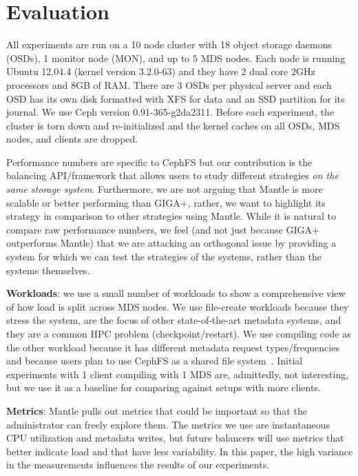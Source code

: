\section{Evaluation}									%
\label{evaluation}										%
All experiments are run on a 10 node cluster with 18 object storage daemons (OSDs), 1 monitor node (MON), and up to 5 MDS nodes. Each node is running Ubuntu 12.04.4 (kernel version 3.2.0-63) and they have 2 dual core 2GHz processors and 8GB of RAM. There are 3 OSDs per physical server and each OSD has its own disk formatted with XFS for data and an SSD partition for its journal. We use Ceph version 0.91-365-g2da2311. Before each experiment, the cluster is torn down and re-initialized and the kernel caches on all OSDs, MDS nodes, and clients are dropped. 

Performance numbers are specific to CephFS but our contribution is the balancing API/framework that allows users to study different strategies {\it on the same storage system}.  Furthermore, we are not arguing that Mantle is more scalable or better performing than GIGA+, rather, we want to highlight its strategy in comparison to other strategies using Mantle. While it is natural to compare raw performance numbers, we feel (and not just because GIGA+ outperforms Mantle) that we are attacking an orthogonal issue by providing a system for which we can test the strategies of the systems, rather than the systems themselves. 

\textbf{Workloads}: we use a small number of workloads to show a comprehensive view of how load is split across MDS nodes. We use file-create workloads because they stress the system, are the focus of other state-of-the-art metadata systems, and they are a common HPC problem (checkpoint/restart). We use compiling code as the other workload because it has different metadata request types/frequencies and because users plan to use CephFS as a shared file system~\cite{website:ceph-cephfs-product-release}. Initial experiments with 1 client compiling with 1 MDS are, admittedly, not interesting, but we use it as a baseline for comparing against setups with more clients. 

\textbf{Metrics}: Mantle pulls out metrics that could be important so that the administrator can freely explore them. The metrics we use are instantaneous CPU utilization and metadata writes, but future balancers will use metrics that better indicate load and that have less variability. In this paper, the high variance in the measurements influences the results of our experiments.

